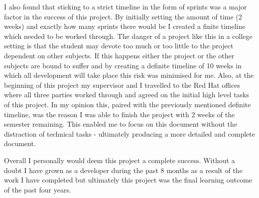 I also found that sticking to a strict timeline in the form of sprints was a major factor in the success of this project. By initially setting the amount of time (2 weeks) and exactly how many sprints there would be I created a finite timeline which needed to be worked through. The danger of a project like this in a college setting is that the student may devote too much or too little to the project dependent on other subjects. If this happens either the project or the other subjects are bound to suffer and by creating a definite timeline of 10 weeks in which all development will take place this risk was minimised for me. Also, at the beginning of this project my supervisor and I travelled to the Red Hat offices where all three parties worked through and agreed on the initial high level tasks of this project. In my opinion this, paired with the previously mentioned definite timeline, was the reason I was able to finish the project with 2 weeks of the semester remaining. This enabled me to focus on this document without the distraction of technical tasks - ultimately producing a more detailed and complete document.

Overall I personally would deem this project a complete success. Without a doubt I have grown as a developer during the past 8 months as a result of the work I have completed but ultimately this project was the final learning outcome of the past four years.

